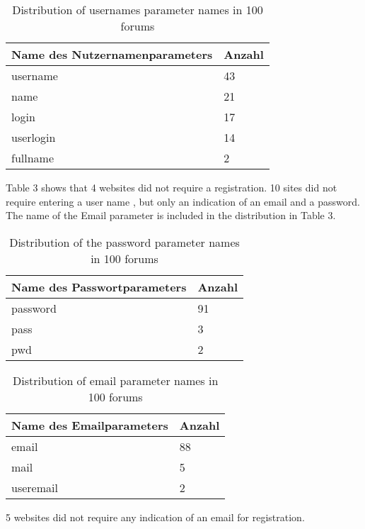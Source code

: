 
\begin{table}[h!]
\centering 
\begin{tabular}{ | p{7cm} | p{3cm}|} \hline
Name des Nutzernamenparameters & Anzahl \\ \hline
username & 43 \\ \hline
name & 21 \\ \hline
login & 17 \\ \hline
userlogin & 14 \\ \hline
fullname & 2 \\ \hline
\end{tabular}
\caption{Distribution of usernames parameter names in 100 forums}
\end{table}

Table 3 shows that 4 websites did not require a registration.
10 sites did not require entering a user name , but only an indication of an email and a password. The name of the Email parameter is included in the distribution in Table 3.

\begin{table}[h!]
\centering 
\begin{tabular}{ | p{7cm} | p{3cm}|} \hline
Name des Passwortparameters & Anzahl \\ \hline
password & 91 \\ \hline
pass & 3 \\ \hline
pwd & 2 \\ \hline
\end{tabular}
\caption{Distribution of the password parameter names in 100 forums}
\end{table}

\begin{table}[h!]
\centering 
\begin{tabular}{ | p{7cm} | p{3cm}|} \hline
Name des Emailparameters & Anzahl \\ \hline
email & 88 \\ \hline
mail & 5 \\ \hline
useremail & 2 \\ \hline
\end{tabular}
\caption{Distribution of email parameter names in 100 forums}
\end{table}

5 websites did not require any indication of an email for registration.


